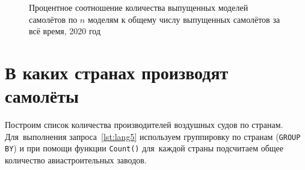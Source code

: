\newpage 
\begin{figure*}[h!]

    \setlength{\fboxsep}{0pt}%
    \setlength{\fboxrule}{1pt}%
    \caption[Доля выпущенных моделей самолётов к общему числу самолётов.]{Процентное соотношение количества выпущенных моделей самолётов по $n$ моделям к общему числу выпущенных самолётов за всё время, 2020 год}%
    \label{fig:Pareto_principle_diargam}%
\end{figure*}






\newpage 
\label{aircraft_question_4}
\section{В каких странах производят самолёты}

Построим список количества производителей воздушных судов по странам. 
Для~выполнения запроса~\ref{lst:lang5} 
используем группировку по странам (\lstinline|GROUP BY|) 
и при помощи функции \lstinline|Count()| 
для~каждой страны подсчитаем общее количество авиастроительных заводов.



